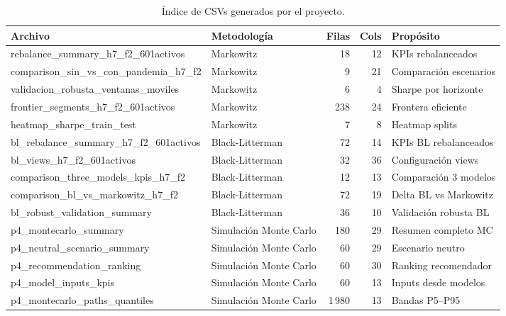 \begin{table}[H]
\centering
\caption{\'Indice de CSVs generados por el proyecto.}
\label{tab:anexo4_csv_index}
\footnotesize
\begin{adjustbox}{max width=\textwidth}
\begin{tabular}{@{}p{}lrrl@{}}
\toprule
Archivo & Metodolog\'ia & Filas & Cols & Prop\'osito \\
\midrule
rebalance\_summary\_h7\_f2\_601activos & Markowitz & 18 & 12 & KPIs rebalanceados \\
comparison\_sin\_vs\_con\_pandemia\_h7\_f2 & Markowitz & 9 & 21 & Comparaci\'on escenarios \\
validacion\_robusta\_ventanas\_moviles & Markowitz & 6 & 4 & Sharpe por horizonte \\
frontier\_segments\_h7\_f2\_601activos & Markowitz & 238 & 24 & Frontera eficiente \\
heatmap\_sharpe\_train\_test & Markowitz & 7 & 8 & Heatmap splits \\
\midrule
bl\_rebalance\_summary\_h7\_f2\_601activos & Black-Litterman & 72 & 14 & KPIs BL rebalanceados \\
bl\_views\_h7\_f2\_601activos & Black-Litterman & 32 & 36 & Configuraci\'on views \\
comparison\_three\_models\_kpis\_h7\_f2 & Black-Litterman & 12 & 13 & Comparaci\'on 3 modelos \\
comparison\_bl\_vs\_markowitz\_h7\_f2 & Black-Litterman & 72 & 19 & Delta BL vs Markowitz \\
bl\_robust\_validation\_summary & Black-Litterman & 36 & 10 & Validaci\'on robusta BL \\
\midrule
p4\_montecarlo\_summary & Simulaci\'on Monte Carlo & 180 & 29 & Resumen completo MC \\
p4\_neutral\_scenario\_summary & Simulaci\'on Monte Carlo & 60 & 29 & Escenario neutro \\
p4\_recommendation\_ranking & Simulaci\'on Monte Carlo & 60 & 30 & Ranking recomendador \\
p4\_model\_inputs\_kpis & Simulaci\'on Monte Carlo & 60 & 13 & Inputs desde modelos \\
p4\_montecarlo\_paths\_quantiles & Simulaci\'on Monte Carlo & 1\,980 & 13 & Bandas P5--P95 \\
\bottomrule
\end{tabular}
\end{adjustbox}
\end{table}

